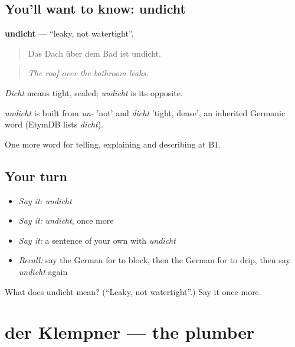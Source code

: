 \subsection*{You'll want to know: undicht}
\textbf{undicht} — \textquotedblleft{}leaky, not watertight\textquotedblright{}.

\begin{quote}
Das Dach über dem Bad ist undicht.
\end{quote}

\begin{quote}
\emph{The roof over the bathroom leaks.}
\end{quote}

\emph{Dicht} means tight, sealed; \emph{undicht} is its opposite.

\begin{cousinweb}
\emph{undicht} is built from \emph{un-} 'not' and \emph{dicht} 'tight, dense', an inherited Germanic word (EtymDB lists \emph{dicht}).
\end{cousinweb}

\begin{grammarlens}[title={What you've built}]
One more word for telling, explaining and describing at B1.
\end{grammarlens}

\subsection*{Your turn}
\begin{itemize}
\raggedright
  \item \emph{Say it:} \emph{undicht}
  \item \emph{Say it:} \emph{undicht}, once more
  \item \emph{Say it:} a sentence of your own with \emph{undicht}
  \item \emph{Recall:} say the German for to block, then the German for to drip, then say \emph{undicht} again
\end{itemize}

\begin{tcolorbox}[breakable,colback=teal!4,colframe=teal!35!black,title={Before you move on}]
What does undicht mean? (\textquotedblleft{}Leaky, not watertight\textquotedblright{}.) Say it once more.
\end{tcolorbox}
\section[der Klempner]{der Klempner — the plumber}

